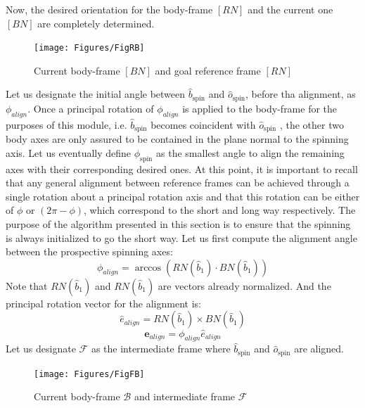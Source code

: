 \documentclass[]{AVSSimReportMemo}
\begin{document}
Now, the desired orientation for the body-frame $[RN]$ and the current one $[BN]$ are completely determined.\newline
\begin{figure}[htb]
	\centerline{
		\texttt{[image: Figures/FigRB]}
	}
	\caption{Current body-frame $[BN]$ and goal reference frame $[RN]$}
	\label{fig:Fig2}
\end{figure} 
\newline
Let us designate the initial angle between $\hat {b}_{\textrm{spin}}$ and $\hat {o}_{\textrm{spin}}$, before tha alignment, as $\phi_{align}$. Once a principal rotation of $\phi_{align}$ is applied to the body-frame for the purposes of this module, i.e. $\hat {b}_{\textrm{spin}}$ becomes coincident with $\hat {o}_{\textrm{spin}}$ , the other two body axes are only assured to be contained in the plane normal to the spinning axis. Let us eventually define $\phi_{\textrm{spin}}$ as the smallest angle to align the remaining axes with their corresponding desired ones.
At this point, it is important to recall that any general alignment between reference frames can be achieved through a single rotation about a principal rotation axis and that this rotation can be either of $\phi$ or $( 2\pi - \phi)$, which correspond to the short and long way respectively. \newline
The purpose of the algorithm presented in this section is to ensure that the spinning is always initialized to go the short way.
Let us first compute the alignment angle between the prospective spinning axes:
\begin{equation}
	\label{eq:phi_align}
	\phi_{align} = \arccos{(RN(\hat b_{1}) \cdot BN(\hat b_{1}))}
\end{equation}
Note that $RN(\hat b_{1})$ and $RN(\hat b_{1})$ are vectors already normalized.
And the principal rotation vector for the alignment is:
\begin{equation}
	\label{eq:e_hat_align}
	\hat{e}_{align} = RN(\hat b_{1}) \times BN(\hat b_{1})
\end{equation}
\begin{equation}
	\label{eq:e_align}
	\bm{e}_{align} = \phi_{align}\hat{e}_{align} 
\end{equation}
Let us designate $\mathcal{F}$ as the intermediate frame where $\hat {b}_{\textrm{spin}}$ and $\hat {o}_{\textrm{spin}}$ are aligned. 
\newline
\begin{figure}[htb]
	\centerline{
		\texttt{[image: Figures/FigFB]}
	}
	\caption{Current body-frame $\mathcal{B}$  and intermediate frame $\mathcal{F}$ }
	\label{fig:Fig3}
\end{figure} 
\end{document}
